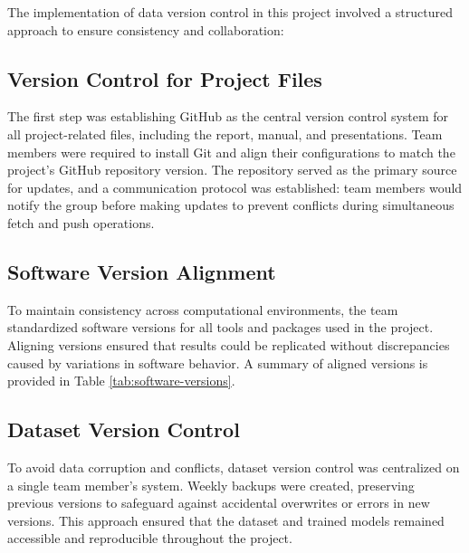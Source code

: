 The implementation of data version control in this project involved a structured approach to ensure consistency and collaboration:

\subsection*{Version Control for Project Files}
The first step was establishing GitHub as the central version control system for all project-related files, including the report, manual, and presentations. Team members were required to install Git and align their configurations to match the project's GitHub repository version. The repository served as the primary source for updates, and a communication protocol was established: team members would notify the group before making updates to prevent conflicts during simultaneous fetch and push operations.

\subsection*{Software Version Alignment}
To maintain consistency across computational environments, the team standardized software versions for all tools and packages used in the project. Aligning versions ensured that results could be replicated without discrepancies caused by variations in software behavior. A summary of aligned versions is provided in Table \ref{tab:software-versions}.

\subsection*{Dataset Version Control}
To avoid data corruption and conflicts, dataset version control was centralized on a single team member's system. Weekly backups were created, preserving previous versions to safeguard against accidental overwrites or errors in new versions. This approach ensured that the dataset and trained models remained accessible and reproducible throughout the project.

